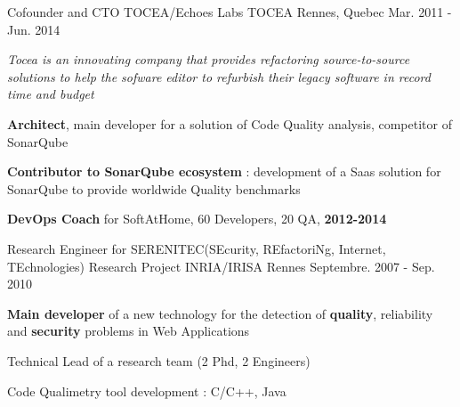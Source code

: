 \begin{cventries}


    \cventry
    {Cofounder and CTO TOCEA/Echoes Labs} %
    {TOCEA} %
    {Rennes, Quebec} %
    {Mar. 2011 - Jun. 2014} %
    {
        \begin{cvitems} %
            \item {\textit{Tocea is an innovating company that provides refactoring source-to-source solutions to help the sofware editor to refurbish their legacy software in record time and budget}}
            \item {\textbf{Architect}, main developer for a solution of Code Quality analysis, competitor of SonarQube }
            \item {\textbf{Contributor to SonarQube ecosystem} : development of a Saas solution for SonarQube to provide worldwide Quality benchmarks}
            \item{\textbf{DevOps Coach} for SoftAtHome, 60 Developers, 20 QA, \textbf{2012-2014}}
        \end{cvitems}
    }

    \cventry
    {Research Engineer for SERENITEC(SEcurity, REfactoriNg, Internet, TEchnologies) Research Project} %
    {INRIA/IRISA} %
    {Rennes} %
    {Septembre. 2007 - Sep. 2010} %
    {
        \begin{cvitems} %
            \item {\textbf{Main developer} of a new technology for the detection of \textbf{quality}, reliability and \textbf{security} problems in Web Applications}
            \item {Technical Lead of a research team (2 Phd, 2 Engineers)}
            \item {Code Qualimetry tool development : C/C++, Java}
        \end{cvitems}
    }


\end{cventries}
